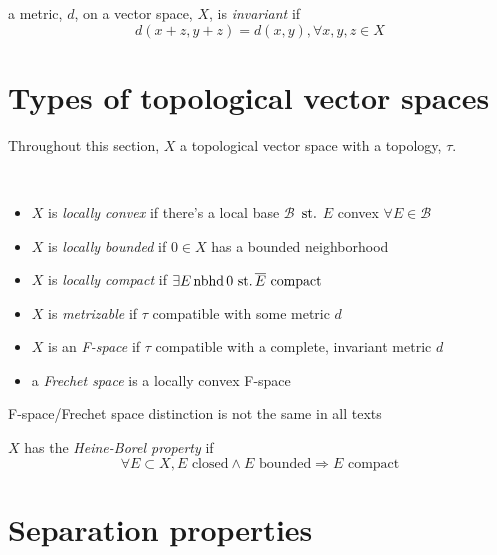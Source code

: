 \begin{defn}
  a metric, $d$, on a vector space, $X$, is \emph{invariant} if
  \[d(x+z,y+z)=d(x,y),\forall x,y,z\in X \]
\end{defn}

\section{Types of topological vector spaces}
Throughout this section, $X$ a topological vector space with
a topology, $\tau$.

\begin{defn}\
  \begin{itemize}
  \item $X$ is \emph{locally convex}
    if there's a local base $\mathcal{B}$ $\operatorname{\,st.}$ $E$ convex
    ${\forall E\in\mathcal{B}}$
  \item $X$ is \emph{locally bounded}
    if ${0\in X}$ has a bounded neighborhood
  \item $X$ is \emph{locally compact} if
    ${\exists E \operatorname{nbhd} 0 \operatorname{\,st.} \overline{E}\text{ compact}}$
  \item $X$ is \emph{metrizable} if $\tau$ compatible with some
    metric $d$
  \item $X$ is an \emph{F-space} if $\tau$ compatible with
    a complete, invariant metric $d$
  \item a \emph{Frechet space} is
    a locally convex F-space
  \end{itemize}
\end{defn}

\begin{rem}{}
  F-space/Frechet space distinction is not the same in all
  texts
\end{rem}

\begin{defn}
\end{defn}

\begin{defn}
  $X$ has the \emph{Heine-Borel property} if
  \[
  \forall E\subset X,
  E\text{ closed}\land E\text{ bounded}
  \Rightarrow E\text{ compact}
  \]
\end{defn}

\section{Separation properties}

